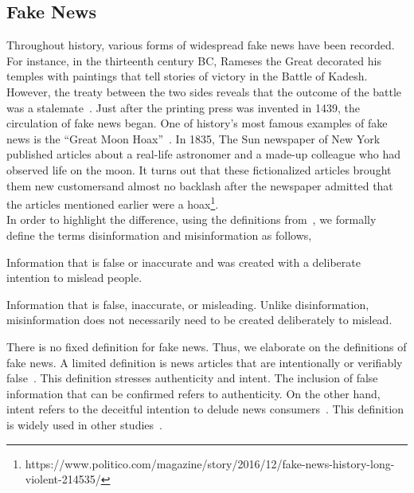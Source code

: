 \subsection{Fake News}
\label{subsec:fakeNewsDetection_fakeNews}
Throughout history, various forms of widespread fake news have been recorded. For instance, in the thirteenth century BC, Rameses the Great decorated his temples with paintings that tell stories of victory in the Battle of Kadesh. However, the treaty between the two sides reveals
that the outcome of the battle was a stalemate~\parencite{HistorysGreatestLies_Weir}. Just after the printing press was invented in 1439,
the circulation of fake news began. One of history's most famous examples of fake news is the
“Great Moon Hoax”~\parencite{TheGreatMoonHoax_Foster}. In 1835, The Sun newspaper of New York published articles about a real-life astronomer and a made-up colleague who had observed life on the moon. It turns out that these fictionalized articles brought them new customersand almost no backlash after the newspaper admitted that the articles mentioned earlier
were a hoax\footnote{https://www.politico.com/magazine/story/2016/12/fake-news-history-long-violent-214535/}.\\
In order to highlight the difference, using the definitions from~\parencite{ThePsycologyOfFakeNews_Pennycook}, we formally define the terms disinformation and misinformation as follows,
\begin{definition}
    Information that is false or inaccurate and was created with a deliberate intention to mislead people.
\end{definition}
\begin{definition}
    Information that is false, inaccurate, or misleading. Unlike disinformation, misinformation does not necessarily need to be created deliberately
    to mislead.
\end{definition}
There is no fixed definition for fake news. Thus, we elaborate on the definitions of fake news. A limited definition is news articles that are intentionally or verifiably false~\parencite{SocialMediaAndFakeNewsIn2016Election_Allcott}. This definition stresses authenticity and intent. The inclusion of false information that can be confirmed refers to authenticity. On the other hand, intent refers to the deceitful intention to delude news consumers~\parencite{FakeNewsDetectionOnSocialMediaADataMiningPerspective_Shu}. This definition is widely used in other studies~\parencite{AutomaticDeceptionDetection_Conroy, TheFakeNewsSpreadingPlague_Mustafaraj, FakeNewsDetectionOnSocialMediaADataMiningPerspective_Shu}.
